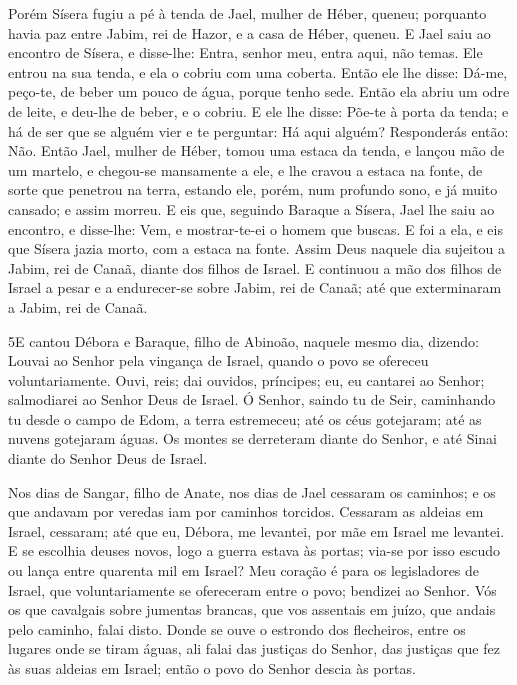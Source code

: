 Porém Sísera fugiu a pé à tenda de Jael, mulher de Héber, queneu;
porquanto havia paz entre Jabim, rei de Hazor, e a casa de Héber,
queneu. E Jael saiu ao encontro de Sísera, e disse-lhe:
Entra, senhor meu, entra aqui, não temas. Ele entrou na sua tenda, e
ela o cobriu com uma coberta. Então ele lhe disse: Dá-me,
peço-te, de beber um pouco de água, porque tenho sede. Então ela
abriu um odre de leite, e deu-lhe de beber, e o cobriu. E ele
lhe disse: Põe-te à porta da tenda; e há de ser que se alguém vier e
te perguntar: Há aqui alguém? Responderás então: Não. Então
Jael, mulher de Héber, tomou uma estaca da tenda, e lançou mão de um
martelo, e chegou-se mansamente a ele, e lhe cravou a estaca na
fonte, de sorte que penetrou na terra, estando ele, porém, num
profundo sono, e já muito cansado; e assim morreu. E eis que,
seguindo Baraque a Sísera, Jael lhe saiu ao encontro, e disse-lhe:
Vem, e mostrar-te-ei o homem que buscas. E foi a ela, e eis que
Sísera jazia morto, com a estaca na fonte. Assim Deus naquele
dia sujeitou a Jabim, rei de Canaã, diante dos filhos de Israel.
E continuou a mão dos filhos de Israel a pesar e a
endurecer-se sobre Jabim, rei de Canaã; até que exterminaram a
Jabim, rei de Canaã.

\medskip

\lettrine{5} E cantou Débora e Baraque, filho de Abinoão,
naquele mesmo dia, dizendo: Louvai ao Senhor pela vingança de
Israel, quando o povo se ofereceu voluntariamente. Ouvi, reis;
dai ouvidos, príncipes; eu, eu cantarei ao Senhor; salmodiarei ao
Senhor Deus de Israel. Ó Senhor, saindo tu de Seir, caminhando
tu desde o campo de Edom, a terra estremeceu; até os céus gotejaram;
até as nuvens gotejaram águas. Os montes se derreteram diante do
Senhor, e até Sinai diante do Senhor Deus de Israel.

Nos dias de Sangar, filho de Anate, nos dias de Jael cessaram os
caminhos; e os que andavam por veredas iam por caminhos torcidos.
Cessaram as aldeias em Israel, cessaram; até que eu, Débora, me
levantei, por mãe em Israel me levantei. E se escolhia deuses
novos, logo a guerra estava às portas; via-se por isso escudo ou
lança entre quarenta mil em Israel? Meu coração é para os
legisladores de Israel, que voluntariamente se ofereceram entre o
povo; bendizei ao Senhor. Vós os que cavalgais sobre jumentas
brancas, que vos assentais em juízo, que andais pelo caminho, falai
disto. Donde se ouve o estrondo dos flecheiros, entre os
lugares onde se tiram águas, ali falai das justiças do Senhor, das
justiças que fez às suas aldeias em Israel; então o povo do Senhor
descia às portas.

